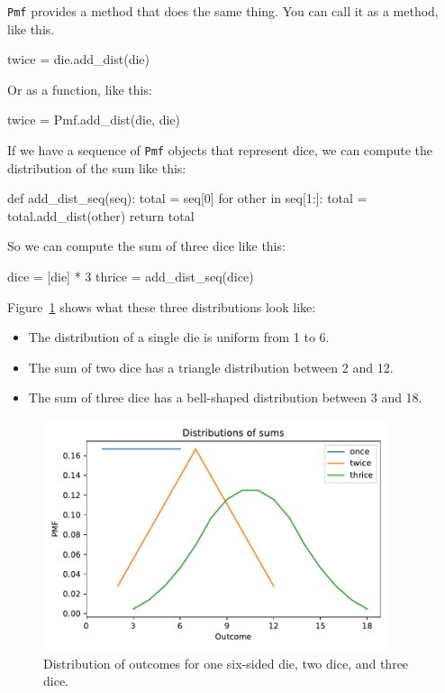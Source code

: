\documentclass[12pt]{book}
\theoremstyle{exercise}
\newcommand{\py}[1]{{\tt #1}}%
\begin{document}
\py{Pmf} provides a method that does the same thing.
You can call it as a method, like this.

\begin{code}
twice = die.add_dist(die)
\end{code}

Or as a function, like this:

\begin{code}
twice = Pmf.add_dist(die, die)
\end{code}

If we have a sequence of \py{Pmf} objects that represent dice, we can compute the distribution of the sum like this:

\begin{code}
def add_dist_seq(seq):
    total = seq[0]
    for other in seq[1:]:
        total = total.add_dist(other)
    return total
\end{code}

So we can compute the sum of three dice like this:

\begin{code}
dice = [die] * 3
thrice = add_dist_seq(dice)
\end{code}

Figure~\ref{fig05-01} shows what these three distributions look like:

\begin{itemize}

\item The distribution of a single die is uniform from 1 to 6.

\item The sum of two dice has a triangle distribution between 2 and 12.

\item The sum of three dice has a bell-shaped distribution between 3 and 18.

\end{itemize}

\begin{figure}
\centerline{\includegraphics[width=4in]{figs/fig05-01.pdf}}
\caption{Distribution of outcomes for one six-sided die, two dice, and three dice.}
\label{fig05-01}
\end{figure}
\end{document}
